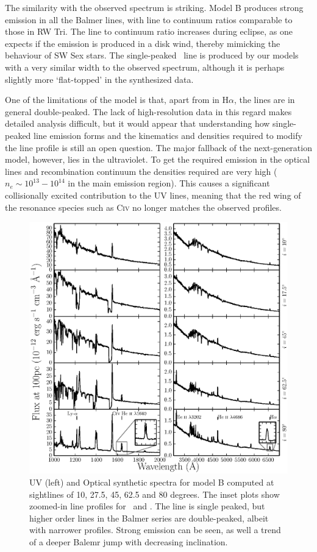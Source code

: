 \documentclass[preprint, a4paper, 11pt]{aastex}
\begin{document}
The similarity with the observed spectrum is striking. 
Model B produces strong emission in all the Balmer lines, 
with line to continuum ratios
comparable to those in RW Tri. 
The line to continuum ratio increases during eclipse,
as one expects if the emission is produced in a disk wind, 
thereby mimicking the behaviour of SW Sex stars.
The single-peaked \ha\ line is produced by our models with a 
very similar width to the observed spectrum, although it is perhaps slightly more
`flat-topped' in the synthesized data.

One of the limitations of the model is that, apart 
from in H$\alpha$, the lines are in general double-peaked. 
The lack of high-resolution data in this regard makes detailed analysis difficult,
but it would appear that understanding how single-peaked 
line emission forms and the kinematics and densities required to
modify the line profile is still an open question. 
The major fallback of the next-generation model, however, lies
in the ultraviolet. To get the required emission in the optical lines
and recombination continuum the densities required are very high 
($n_e\sim10^{13}-10^{14}$ in the main emission region).
This causes a significant collisionally excited contribution
to the UV lines, meaning that the red wing of the 
resonance species such as C\textsc{iv} no longer matches the
observed profiles. 




\begin{figure} %
\includegraphics[width=\textwidth]{figures/fig14_uv_opt.eps}
\caption{
UV (left) and Optical synthetic spectra for model B computed at
sightlines of 10, 27.5, 45, 62.5 and 80 degrees.	
The inset plots show zoomed-in line profiles for 
\heiiuv \ and \ha. The \ha line 
is single peaked, but higher order lines in the Balmer series
are double-peaked, albeit with narrower profiles.
Strong \heiiopt emission can be seen, as well a trend
of a deeper Balemr jump with decreasing inclination.
}
\label{uvoptb}
\end{figure} %
\end{document}
